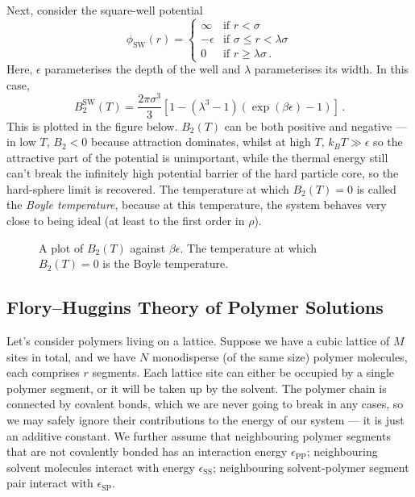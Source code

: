 \documentclass{article}
\theoremstyle{plain}\theoremheaderfont{\normalfont\bfseries}\theorembodyfont{\rmfamily}\theoremseparator{.}\newtheorem*{thm}{Theorem}\newtheorem*{law}{Law}\newtheorem*{pos}{Postulate}
\numberwithin{equation}{section}
\begin{document}
    Next, consider the square-well potential
    \begin{equation}
        \phi_{\text{SW}}(r)=\begin{cases}
            \infty & \text{if }r<\sigma \\
            -\epsilon & \text{if }\sigma\le r<\lambda\sigma \\
            0 & \text{if }r\ge\lambda\sigma\,.
        \end{cases}
    \end{equation}
    Here, \(\epsilon\) parameterises the depth of the well and \(\lambda\) parameterises its width. In this case, 
    \begin{equation}
        B_2^{\text{SW}}(T)=\frac{2\pi\sigma^3}{3}\left[1-(\lambda^3-1)(\exp(\beta\epsilon)-1)\right]\,.
    \end{equation}
    This is plotted in the figure below. \(B_2(T)\) can be both positive and negative --- in low \(T\), \(B_2<0\) because attraction dominates, whilst at high \(T\), \(k_B T\gg \epsilon\) so the attractive part of the potential is unimportant, while the thermal energy still can't break the infinitely high potential barrier of the hard particle core, so the hard-sphere limit is recovered. The temperature at which \(B_2(T)=0\) is called the \textit{Boyle temperature}, because at this temperature, the system behaves very close to being ideal (at least to the first order in \(\rho\)).
    
    \begin{figure}
        \centering
        \caption{A plot of \(B_2(T)\) against \(\beta\epsilon\). The temperature at which \(B_2(T)=0\) is the Boyle temperature.}
    \end{figure}

    \subsection{Flory--Huggins Theory of Polymer Solutions}
    Let's consider polymers living on a lattice. Suppose we have a cubic lattice of \(M\) sites in total, and we have \(N\) monodisperse (of the same size) polymer molecules, each comprises \(r\) segments. Each lattice site can either be occupied by a single polymer segment, or it will be taken up by the solvent. The polymer chain is connected by covalent bonds, which we are never going to break in any cases, so we may safely ignore their contributions to the energy of our system --- it is just an additive constant. We further assume that neighbouring polymer segments that are not covalently bonded has an interaction energy \(\epsilon_{\text{PP}}\); neighbouring solvent molecules interact with energy \(\epsilon_{\text{SS}}\); neighbouring solvent-polymer segment pair interact with \(\epsilon_{\text{SP}}\).
\end{document}
